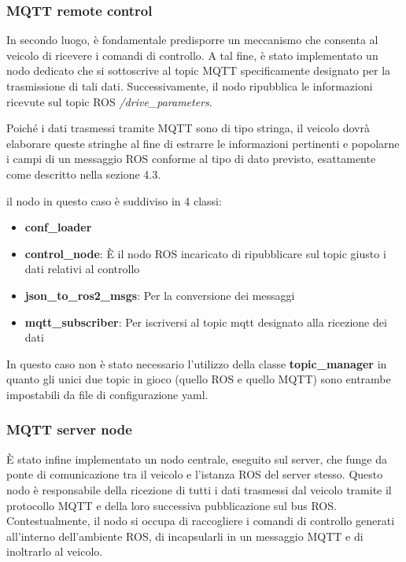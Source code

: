 \subsubsection{MQTT remote control}
In secondo luogo, è fondamentale predisporre un meccanismo che consenta al veicolo di ricevere i comandi di controllo. A tal fine, è stato implementato un nodo dedicato che si sottoscrive al topic MQTT specificamente designato per la trasmissione di tali dati. Successivamente, il nodo ripubblica le informazioni ricevute sul topic ROS \textit{/drive\_parameters}.

\noindent Poiché i dati trasmessi tramite MQTT sono di tipo stringa, il veicolo dovrà elaborare queste stringhe al fine di estrarre le informazioni pertinenti e popolarne i campi di un messaggio ROS conforme al tipo di dato previsto, esattamente come descritto nella sezione 4.3.

\noindent il nodo in questo caso è suddiviso in 4 classi: 

\begin{itemize}
  \item \textbf{conf\_loader}
  \item \textbf{control\_node}: È il nodo ROS incaricato di ripubblicare sul topic giusto i dati relativi al controllo
  \item \textbf{json\_to\_ros2\_msgs}: Per la conversione dei messaggi
  \item \textbf{mqtt\_subscriber}: Per iscriversi al topic mqtt designato alla ricezione dei dati
\end{itemize}

\noindent In questo caso non è stato necessario l'utilizzo della classe \textbf{topic\_manager} in quanto gli unici due topic in gioco (quello ROS e quello MQTT) sono entrambe impostabili da file di configurazione yaml.

\subsubsection{MQTT server node}
È stato infine implementato un nodo centrale, eseguito sul server, che funge da ponte di comunicazione tra il veicolo e l'istanza ROS del server stesso. Questo nodo è responsabile della ricezione di tutti i dati trasmessi dal veicolo tramite il protocollo MQTT e della loro successiva pubblicazione sul bus ROS. Contestualmente, il nodo si occupa di raccogliere i comandi di controllo generati all'interno dell'ambiente ROS, di incapsularli in un messaggio MQTT e di inoltrarlo al veicolo.

